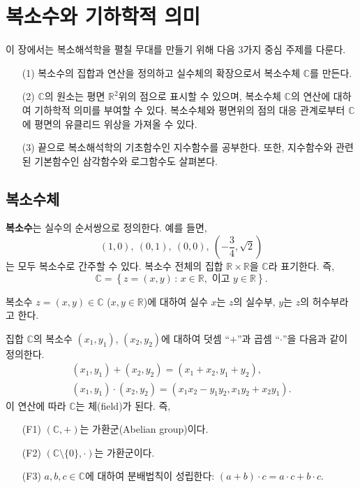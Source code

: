 
\chapter{복소수와 기하학적 의미}


이 장에서는 복소해석학을 펼칠 무대를 만들기 위해
다음 3가지 중심 주제를 다룬다.

\begin{itemize}
\item[(1)] 복소수의 집합과 연산을 정의하고 실수체의 확장으로서 복소수체 $\mathbb C$를 만든다.
\item[(2)] $\mathbb C$의 원소는 평면 $\mathbb R^2$위의 점으로 표시할 수 있으며, 복소수체 $\mathbb C$의 연산에 대하여
기하학적 의미를 부여할 수 있다. 복소수체와 평면위의 점의 대응 관계로부터
$\mathbb C$에 평면의 유클리드 위상을 가져올 수 있다.
\item[(3)] 끝으로 복소해석학의 기초함수인 지수함수를 공부한다.
또한, 지수함수와 관련된 기본함수인 삼각함수와 로그함수도 살펴본다. 
\end{itemize}

\section{복소수체}

{\bf 복소수}는 실수의 순서쌍으로 정의한다. 예를 들면,
$$
(1,0), \ (0,1), \ (0,0), \ \left(-\dfrac34, \sqrt{2} \right)
$$
는 모두 복소수로 간주할 수 있다.
복소수 전체의 집합 $\mathbb R \times \mathbb R$을 $\mathbb C$라 표기한다. 즉,
$$
\mathbb C = \left\{ z = (x,y) \,:\, x\in \mathbb R, \text{ 이고 } y\in \mathbb R \right\}.
$$

복소수 $z=(x,y)\in \mathbb C$ ($x,y \in \mathbb R$)에 대하여
실수 $x$는 $z$의 실수부, $y$는 $z$의 허수부라고 한다.

집합 $\mathbb C$의
복소수 $(x_1, y_1)$, $(x_2, y_2)$에 대하여
덧셈 ``$+$''과 곱셈 ``$\cdot$''을 다음과 같이 정의한다.
\begin{gather*}
(x_1, y_1) + (x_2, y_2) = (x_1+x_2, y_1+y_2), \\
(x_1, y_1) \cdot (x_2, y_2) = (x_1x_2 - y_1y_2, x_1y_2 + x_2y_1).
\end{gather*}
이 연산에 따라 $\mathbb C$는 체(field)가 된다. 즉,
\begin{itemize}
\item[(F1)]  $(\mathbb C, +)$는 가환군(Abelian group)이다.
\item[(F2)] $(\mathbb C\setminus \{0\}, \cdot)$는 가환군이다.
\item[(F3)] $a,b,c\in\mathbb C$에 대하여 분배법칙이 성립한다:  $(a+b)\cdot c = a\cdot c + b\cdot c$.
\end{itemize}

